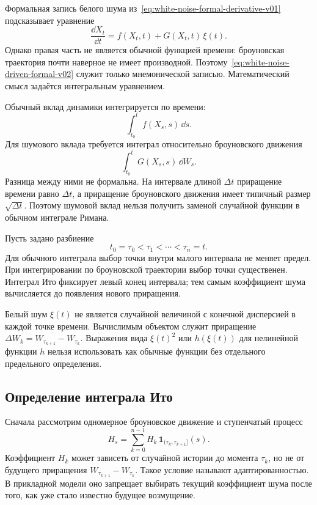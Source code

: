 Формальная запись белого шума из~\eqref{eq:white-noise-formal-derivative-v01} подсказывает уравнение
\begin{equation}
\label{eq:white-noise-driven-formal-v02}
\frac{\dd X_t}{\dd t}
=
f(X_t,t)+G(X_t,t)\,\xi(t).
\end{equation}
Однако правая часть не является обычной функцией времени: броуновская траектория почти наверное не имеет производной. Поэтому~\eqref{eq:white-noise-driven-formal-v02} служит только мнемонической записью. Математический смысл задаётся интегральным уравнением.

Обычный вклад динамики интегрируется по времени:
\begin{equation}
\label{eq:drift-integral-v02}
\int_{t_0}^{t} f(X_s,s)\,\dd s.
\end{equation}
Для шумового вклада требуется интеграл относительно броуновского движения
\begin{equation}
\label{eq:stochastic-integral-required-v02}
\int_{t_0}^{t} G(X_s,s)\,\dd W_s.
\end{equation}
Разница между ними не формальна. На интервале длиной $\Delta t$ приращение времени равно $\Delta t$, а приращение броуновского движения имеет типичный размер $\sqrt{\Delta t}$. Поэтому шумовой вклад нельзя получить заменой случайной функции в обычном интеграле Римана.

Пусть задано разбиение
\[
t_0=\tau_0<\tau_1<\cdots<\tau_n=t.
\]
Для обычного интеграла выбор точки внутри малого интервала не меняет предел. При интегрировании по броуновской траектории выбор точки существенен. Интеграл Ито фиксирует левый конец интервала; тем самым коэффициент шума вычисляется до появления нового приращения.

\begin{caution}
Белый шум $\xi(t)$ не является случайной величиной с конечной дисперсией в каждой точке времени. Вычислимым объектом служит приращение $\Delta W_k=W_{\tau_{k+1}}-W_{\tau_k}$. Выражения вида $\xi(t)^2$ или $h(\xi(t))$ для нелинейной функции $h$ нельзя использовать как обычные функции без отдельного предельного определения.
\end{caution}

\subsection{Определение интеграла Ито}

Сначала рассмотрим одномерное броуновское движение и ступенчатый процесс
\begin{equation}
\label{eq:simple-adapted-process-v02}
H_s
=
\sum_{k=0}^{n-1}
H_k\,\mathbf 1_{(\tau_k,\tau_{k+1}]}(s).
\end{equation}
Коэффициент $H_k$ может зависеть от случайной истории до момента $\tau_k$, но не от будущего приращения $W_{\tau_{k+1}}-W_{\tau_k}$. Такое условие называют адаптированностью. В прикладной модели оно запрещает выбирать текущий коэффициент шума после того, как уже стало известно будущее возмущение.

